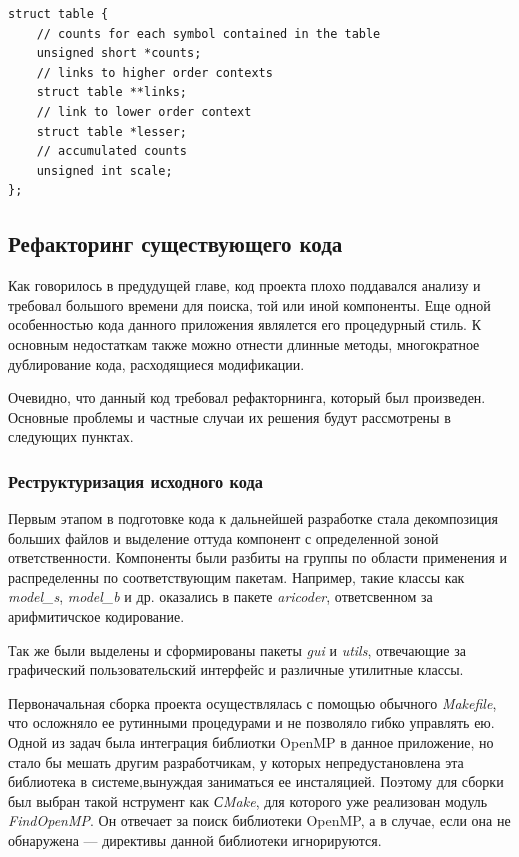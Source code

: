 \documentclass{matmex-diploma-custom}
\begin{document}
\begin{lstlisting}
struct table {
    // counts for each symbol contained in the table
    unsigned short *counts;
    // links to higher order contexts
    struct table **links;
    // link to lower order context
    struct table *lesser;
    // accumulated counts
    unsigned int scale;
};
\end{lstlisting}
\subsection{Рефакторинг существующего кода}
Как говорилось в предудущей главе, код проекта плохо поддавался анализу и требовал большого времени для поиска, той или иной компоненты. Еще одной особенностью кода данного приложения являлется его процедурный стиль. К основным недостаткам также можно отнести длинные методы, многократное дублирование кода, расходящиеся модификации.

Очевидно, что данный код требовал рефакторнинга, который был произведен. Основные проблемы и частные случаи их  решения будут рассмотрены в следующих пунктах.

\subsubsection{Реструктуризация исходного кода}
Первым этапом в  подготовке кода к дальнейшей разработке стала декомпозиция больших файлов и выделение оттуда компонент с определенной зоной ответственности. Компоненты  были разбиты на группы по области применения и распределенны по соответствующим пакетам. Например, такие классы как \emph{model\_s}, \emph{model\_b} и др. оказались в пакете \emph{aricoder}, ответсвенном за арифмитичское кодирование.

Так же были выделены и сформированы пакеты \emph{gui} и \emph{utils}, отвечающие за графический пользовательский интерфейс и различные утилитные классы.

Первоначальная сборка проекта осуществлялась с помощью обычного \emph{Makefile}, что осложняло ее рутинными процедурами и не позволяло гибко управлять ею. Одной из задач была интеграция библиотки OpenMP в данное приложение, но стало бы мешать другим разработчикам, у которых непредустановлена эта библиотека в системе,вынуждая  заниматься ее инсталяцией. Поэтому для сборки был выбран такой нструмент как \emph{СMake}, для которого уже реализован модуль \emph{FindOpenMP}. Он отвечает за поиск библиотеки OpenMP, а в случае, если она не обнаружена --- директивы данной библиотеки игнорируются.
\end{document}
